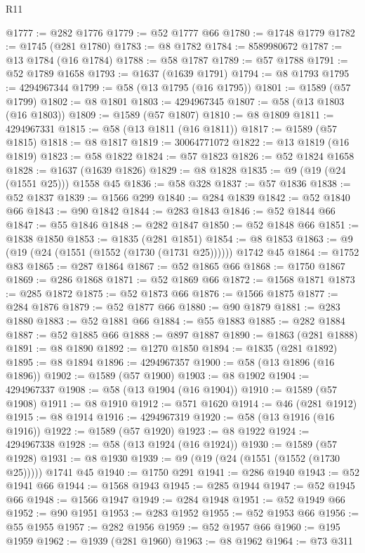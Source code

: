 \begin{lexlean}{R11}
\begin{coremodule}
@1777 := @282 @1776
@1779 := @52 @1777 @66
@1780 := @1748 @1779
@1782 := @1745 (@281 @1780)
@1783 := @8 @1782
@1784 := 8589980672
@1787 := @13 @1784 (@16 @1784)
@1788 := @58 @1787
@1789 := @57 @1788
@1791 := @52 @1789 @1658
@1793 := @1637 (@1639 @1791)
@1794 := @8 @1793
@1795 := 4294967344
@1799 := @58 (@13 @1795 (@16 @1795))
@1801 := @1589 (@57 @1799)
@1802 := @8 @1801
@1803 := 4294967345
@1807 := @58 (@13 @1803 (@16 @1803))
@1809 := @1589 (@57 @1807)
@1810 := @8 @1809
@1811 := 4294967331
@1815 := @58 (@13 @1811 (@16 @1811))
@1817 := @1589 (@57 @1815)
@1818 := @8 @1817
@1819 := 30064771072
@1822 := @13 @1819 (@16 @1819)
@1823 := @58 @1822
@1824 := @57 @1823
@1826 := @52 @1824 @1658
@1828 := @1637 (@1639 @1826)
@1829 := @8 @1828
@1835 := @9 (@19 (@24 (@1551 @25))) @1558 @45
@1836 := @58 @328
@1837 := @57 @1836
@1838 := @52 @1837
@1839 := @1566 @299
@1840 := @284 @1839
@1842 := @52 @1840 @66
@1843 := @90 @1842
@1844 := @283 @1843
@1846 := @52 @1844 @66
@1847 := @55 @1846
@1848 := @282 @1847
@1850 := @52 @1848 @66
@1851 := @1838 @1850
@1853 := @1835 (@281 @1851)
@1854 := @8 @1853
@1863 := @9 (@19 (@24 (@1551 (@1552 (@1730 (@1731 @25)))))) @1742 @45
@1864 := @1752 @83
@1865 := @287 @1864
@1867 := @52 @1865 @66
@1868 := @1750 @1867
@1869 := @286 @1868
@1871 := @52 @1869 @66
@1872 := @1568 @1871
@1873 := @285 @1872
@1875 := @52 @1873 @66
@1876 := @1566 @1875
@1877 := @284 @1876
@1879 := @52 @1877 @66
@1880 := @90 @1879
@1881 := @283 @1880
@1883 := @52 @1881 @66
@1884 := @55 @1883
@1885 := @282 @1884
@1887 := @52 @1885 @66
@1888 := @897 @1887
@1890 := @1863 (@281 @1888)
@1891 := @8 @1890
@1892 := @1270 @1850
@1894 := @1835 (@281 @1892)
@1895 := @8 @1894
@1896 := 4294967357
@1900 := @58 (@13 @1896 (@16 @1896))
@1902 := @1589 (@57 @1900)
@1903 := @8 @1902
@1904 := 4294967337
@1908 := @58 (@13 @1904 (@16 @1904))
@1910 := @1589 (@57 @1908)
@1911 := @8 @1910
@1912 := @571 @1620
@1914 := @46 (@281 @1912)
@1915 := @8 @1914
@1916 := 4294967319
@1920 := @58 (@13 @1916 (@16 @1916))
@1922 := @1589 (@57 @1920)
@1923 := @8 @1922
@1924 := 4294967338
@1928 := @58 (@13 @1924 (@16 @1924))
@1930 := @1589 (@57 @1928)
@1931 := @8 @1930
@1939 := @9 (@19 (@24 (@1551 (@1552 (@1730 @25))))) @1741 @45
@1940 := @1750 @291
@1941 := @286 @1940
@1943 := @52 @1941 @66
@1944 := @1568 @1943
@1945 := @285 @1944
@1947 := @52 @1945 @66
@1948 := @1566 @1947
@1949 := @284 @1948
@1951 := @52 @1949 @66
@1952 := @90 @1951
@1953 := @283 @1952
@1955 := @52 @1953 @66
@1956 := @55 @1955
@1957 := @282 @1956
@1959 := @52 @1957 @66
@1960 := @195 @1959
@1962 := @1939 (@281 @1960)
@1963 := @8 @1962
@1964 := @73 @311

\end{coremodule}
\end{lexlean}
